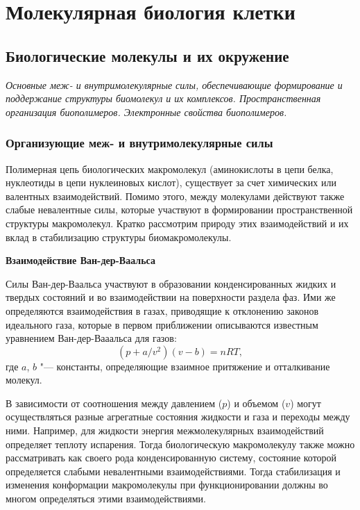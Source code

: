 \documentclass[12pt,a4paper,oneside]{book}
\begin{document}
\chapter{Молекулярная биология клетки}

\section{Биологические молекулы и их окружение}
{\it Основные меж- и внутримолекулярные силы, обеспечивающие формирование и поддержание структуры биомолекул и их комплексов. Пространственная организация биополимеров. Электронные свойства биополимеров.}

\subsection{Организующие меж- и внутримолекулярные силы}

Полимерная цепь биологических макромолекул  (аминокислоты в цепи белка, нуклеотиды в цепи нуклеиновых кислот), существует за счет химических или валентных взаимодействий. Помимо этого, между молекулами действуют также слабые невалентные силы, которые участвуют в формировании пространственной структуры макромолекул. Кратко рассмотрим природу этих взаимодействий и их вклад в стабилизацию структуры биомакромолекулы.

\textbf{Взаимодействие Ван-дер-Ваальса}

Силы Ван-дер-Ваальса участвуют в образовании конденсированных жидких и твердых состояний и во взаимодействии на поверхности раздела фаз. Ими же определяются взаимодействия в газах, приводящие к отклонению законов идеального газа, которые в первом приближении описываются известным уравнением Ван-дер-Вааальса для газов: 
\begin{equation}
	(p + a/v^2)(v-b) = nRT,
\end{equation}
где $a$, $b$ "--- константы, определяющие взаимное притяжение и отталкивание молекул.

В зависимости от соотношения между давлением ($p$) и объемом ($v$) могут осуществляться разные агрегатные состояния жидкости и газа и переходы между ними. Например, для жидкости энергия межмолекулярных взаимодействий определяет теплоту испарения. Тогда биологическую макромолекулу также можно рассматривать как своего рода конденсированную систему, состояние которой определяется слабыми невалентными взаимодействиями. Тогда стабилизация и изменения конформации макромолекулы при функционировании должны во многом определяться  этими взаимодействиями.
\end{document}
